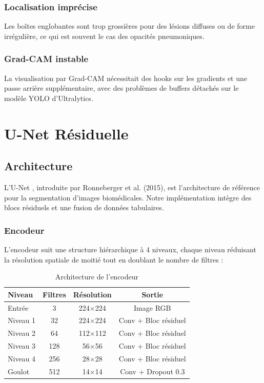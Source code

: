 \documentclass[12pt,a4paper,twoside]{report}
\begin{document}
\subsubsection{Localisation imprécise}
Les boîtes englobantes sont trop grossières pour des lésions diffuses ou de forme irrégulière, ce qui est souvent le cas des opacités pneumoniques.

\subsubsection{Grad-CAM instable}
La visualisation par Grad-CAM nécessitait des hooks sur les gradients et une passe arrière supplémentaire, avec des problèmes de buffers détachés sur le modèle YOLO d'Ultralytics.

\section{U-Net Résiduelle}

\subsection{Architecture}

L'U-Net \cite{unet}, introduite par Ronneberger et al. (2015), est l'architecture de référence pour la segmentation d'images biomédicales. Notre implémentation intègre des blocs résiduels et une fusion de données tabulaires.

\subsubsection{Encodeur}

L'encodeur suit une structure hiérarchique à 4 niveaux, chaque niveau réduisant la résolution spatiale de moitié tout en doublant le nombre de filtres :

\begin{table}[H]
\centering
\begin{tabular}{lccc}
\toprule
\textbf{Niveau} & \textbf{Filtres} & \textbf{Résolution} & \textbf{Sortie} \\
\midrule
Entrée & 3 & 224$\times$224 & Image RGB \\
Niveau 1 & 32 & 224$\times$224 & Conv + Bloc résiduel \\
Niveau 2 & 64 & 112$\times$112 & Conv + Bloc résiduel \\
Niveau 3 & 128 & 56$\times$56 & Conv + Bloc résiduel \\
Niveau 4 & 256 & 28$\times$28 & Conv + Bloc résiduel \\
Goulot & 512 & 14$\times$14 & Conv + Dropout 0.3 \\
\bottomrule
\end{tabular}
\caption{Architecture de l'encodeur}
\end{table}
\end{document}
